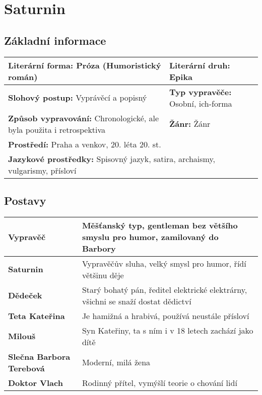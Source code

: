\section{Saturnin}
\subsection*{Základní informace}
\begin{tabularx}{\linewidth}{l|l}
    \textbf{Literární forma:} Próza (Humoristický román)                         & \textbf{Literární druh:} Epika            \\
    \hline
    \textbf{Slohový postup:} Vyprávěcí a popisný                                 & \textbf{Typ vypravěče:} Osobní, ich-forma \\
    \hline
    \textbf{Způsob vypravování:} Chronologické, ale byla použita i retrospektiva & \textbf{Žánr:} Žánr                       \\
    \hline
    \multicolumn{2}{l}{\textbf{Prostředí:} Praha a venkov, 20. léta 20. st.}                                                 \\
    \hline
    \multicolumn{2}{l}{\textbf{Jazykové prostředky:} Spisovný jazyk, satira, archaismy, vulgarismy, přísloví}                \\
\end{tabularx}
\subsection*{Postavy}
\begin{tabularx}{\linewidth}{l|l}
    \textbf{Vypravěč}                & Měšťanský typ, gentleman bez většího smyslu pro humor, zamilovaný do Barbory      \\
    \hline
    \textbf{Saturnin}                & Vypravěčův sluha, velký smysl pro humor, řídí většinu děje                        \\
    \hline
    \textbf{Dědeček}                 & Starý bohatý pán, ředitel elektrické elektrárny, všichni se snaží dostat dědictví \\
    \hline
    \textbf{Teta Kateřina}           & Je hamižná a hrabivá, používá neustále přísloví                                   \\
    \hline
    \textbf{Milouš}                  & Syn Kateřiny, ta s ním i v 18 letech zachází jako dítě                            \\
    \hline
    \textbf{Slečna Barbora Terebová} & Moderní, milá žena                                                                \\
    \hline
    \textbf{Doktor Vlach}            & Rodinný přítel, vymýšlí teorie o chování lidí                                     \\
    \hline
\end{tabularx}
